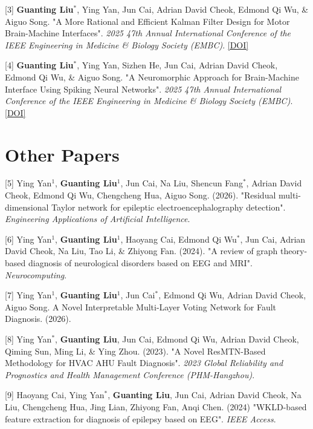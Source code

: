 \documentclass[UTF8,11pt]{ctexart}
\begin{document}
\vspace{0.5em}
[3] \textbf{Guanting Liu$^*$}, Ying Yan, Jun Cai, Adrian David Cheok, Edmond Qi Wu, \& Aiguo Song. "A More Rational and Efficient Kalman Filter Design for Motor Brain-Machine Interfaces". \textit{2025 47th Annual International Conference of the IEEE Engineering in Medicine \& Biology Society (EMBC)}. \href{10.1109/EMBC58623.2025.11251710}{[DOI]}

\vspace{0.5em}
[4] \textbf{Guanting Liu$^*$}, Ying Yan, Sizhen He, Jun Cai, Adrian David Cheok, Edmond Qi Wu, \& Aiguo Song. "A Neuromorphic Approach for Brain-Machine Interface Using Spiking Neural Networks". \textit{2025 47th Annual International Conference of the IEEE Engineering in Medicine \& Biology Society (EMBC)}. \href{10.1109/EMBC58623.2025.11254255}{[DOI]}


\section*{Other Papers}

[5] Ying Yan$^1$, \textbf{Guanting Liu}$^1$, Jun Cai, Na Liu, Shencun Fang$^*$, Adrian David Cheok, Edmond Qi Wu, Chengcheng Hua, Aiguo Song. (2026). "Residual multi-dimensional Taylor network for epileptic electroencephalography detection". \textit{Engineering Applications of Artificial Intelligence}.

\vspace{0.5em}
[6] Ying Yan$^1$, \textbf{Guanting Liu$^1$}, Haoyang Cai, Edmond Qi Wu$^*$, Jun Cai, Adrian David Cheok, Na Liu, Tao Li, \& Zhiyong Fan. (2024). "A review of graph theory-based diagnosis of neurological disorders based on EEG and MRI". \textit{Neurocomputing}.

\vspace{0.5em}
[7] Ying Yan$^1$, \textbf{Guanting Liu$^1$}, Jun Cai$^*$, Edmond Qi Wu, Adrian David Cheok, Aiguo Song. A Novel Interpretable Multi-Layer Voting Network for Fault Diagnosis. (2026).

\vspace{0.5em}
[8] Ying Yan$^*$, \textbf{Guanting Liu}, Jun Cai, Edmond Qi Wu, Adrian David Cheok, Qiming Sun, Ming Li, \& Ying Zhou. (2023). "A Novel ResMTN-Based Methodology for HVAC AHU Fault Diagnosis". \textit{2023 Global Reliability and Prognostics and Health Management Conference (PHM-Hangzhou)}.

\vspace{0.5em}
[9] Haoyang Cai, Ying Yan$^*$, \textbf{Guanting Liu}, Jun Cai, Adrian David Cheok, Na Liu, Chengcheng Hua, Jing Lian, Zhiyong Fan, Anqi Chen. (2024) "WKLD-based feature extraction for diagnosis of epilepsy based on EEG". \textit{IEEE Access}.
\end{document}
